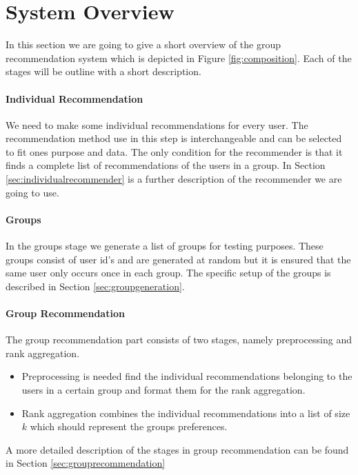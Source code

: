\section{System Overview}\label{sec:systemoverview}
In this section we are going to give a short overview of the group recommendation system which is depicted in Figure \ref{fig:composition}. Each of the stages will be outline with a short description. 

\paragraph{Individual Recommendation} We need to make some individual recommendations for every user. The recommendation method use in this step is interchangeable and can be selected to fit ones purpose and data. The only condition for the recommender is that it finds a complete list of recommendations of the users in a group. In Section \ref{sec:individualrecommender} is a further description of the recommender we are going to use.

\paragraph{Groups} In the groups stage we generate a list of groups for testing purposes. These groups consist of user id's and are generated at random but it is ensured that the same user only occurs once in each group. The specific setup of the groups is described in Section \ref{sec:groupgeneration}.

\paragraph{Group Recommendation} The group recommendation part consists of two stages, namely preprocessing and rank aggregation.
\begin{itemize}
\item Preprocessing is needed find the individual recommendations belonging to the users in a certain group and format them for the rank aggregation.
\item Rank aggregation combines the individual recommendations into a list of size $k$ which should represent the groups preferences.
\end{itemize}
A more detailed description of the stages in group recommendation can be found in Section \ref{sec:grouprecommendation} 

